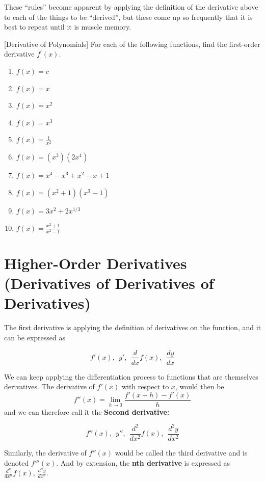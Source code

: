 \documentclass[]{book}
\providecommand{\tightlist}{%
  \setlength{\itemsep}{0pt}\setlength{\parskip}{0pt}}
\theoremstyle{definition}
\theoremstyle{definition}
\theoremstyle{definition}
\theoremstyle{remark}
\begin{document}
These ``rules'' become apparent by applying the definition of the derivative above to each of the things to be ``derived'', but these come up so frequently that it is best to repeat until it is muscle memory.

[Derivative of Polynomials]
\protect\hypertarget{exr:introderivatives}{}{\label{exr:introderivatives} {} }
For each of the following functions, find the first-order derivative \(f^\prime(x)\).

\begin{enumerate}
\def\labelenumi{\arabic{enumi}.}
\tightlist
\item
  \(f(x)=c\)
\item
  \(f(x)=x\)
\item
  \(f(x)=x^2\)
\item
  \(f(x)=x^3\)
\item
  \(f(x)=\frac{1}{x^2}\)
\item
  \(f(x)=(x^3)(2x^4)\)
\item
  \(f(x) = x^4 - x^3 + x^2 - x + 1\)
\item
  \(f(x) = (x^2 + 1)(x^3 - 1)\)
\item
  \(f(x) = 3x^2 + 2x^{1/3}\)
\item
  \(f(x)=\frac{x^2+1}{x^2-1}\)
\end{enumerate}

\hypertarget{derivpoly}{%
\section{Higher-Order Derivatives (Derivatives of Derivatives of Derivatives)}\label{derivpoly}}

The first derivative is applying the definition of derivatives on the function, and it can be expressed as

\[f'(x),  ~~ y',  ~~ \frac{d}{dx}f(x), ~~ \frac{dy}{dx}\]

We can keep applying the differentiation process to functions that are themselves derivatives. The derivative of \(f'(x)\) with respect to \(x\), would then be \[f''(x)=\lim\limits_{h\to 0}\frac{f'(x+h)-f'(x)}{h}\] and we can therefore call it the \textbf{Second derivative:}

\[f''(x), ~~ y'', ~~ \frac{d^2}{dx^2}f(x), ~~ \frac{d^2y}{dx^2}\]

Similarly, the derivative of \(f''(x)\) would be called the third derivative and is denoted \(f'''(x)\). And by extension, the \textbf{nth derivative} is expressed as \(\frac{d^n}{dx^n}f(x)\), \(\frac{d^ny}{dx^n}\).
\end{document}
